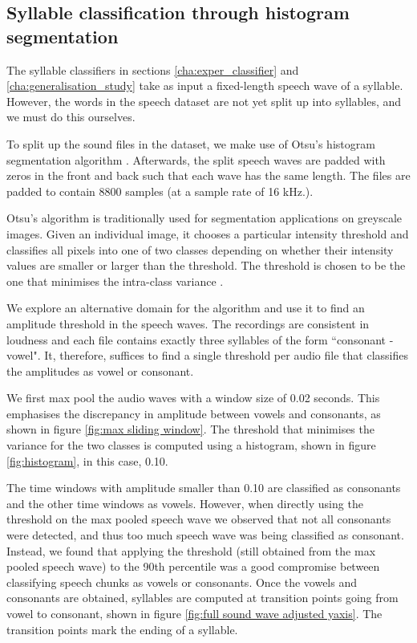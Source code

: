 \begin{appendices}
	\chapter{Syllable classification through histogram segmentation} \label{appendix:split_syllables}
	The syllable classifiers in sections \ref{cha:exper_classifier} and \ref{cha:generalisation_study} take as input a fixed-length speech wave of a syllable. However, the words in the speech dataset are not yet split up into syllables, and we must do this ourselves.
	
	To split up the sound files in the dataset, we make use of Otsu's histogram segmentation algorithm \citep{otsuTlresholdSelectionMethod1979}. Afterwards, the split speech waves are padded with zeros in the front and back such that each wave has the same length. The files are padded to contain 8800 samples (at a sample rate of 16 kHz.).
	
	Otsu's algorithm is traditionally used for segmentation applications on greyscale images. Given an individual image, it chooses a particular intensity threshold and classifies all pixels into one of two classes depending on whether their intensity values are smaller or larger than the threshold. The threshold is chosen to be the one that minimises the intra-class variance \cite{OtsuMethod2023}. 
	
	We explore an alternative domain for the algorithm and use it to find an amplitude threshold in the speech waves. The recordings are consistent in loudness and each file contains exactly three syllables of the form ``consonant - vowel". It, therefore, suffices to find a single threshold per audio file that classifies the amplitudes as vowel or consonant.
	
	We first max pool the audio waves with a window size of 0.02 seconds. This emphasises the discrepancy in amplitude between vowels and consonants, as shown in figure \ref{fig:max sliding window}. The threshold that minimises the variance for the two classes is computed using a histogram, shown in figure \ref{fig:histogram}, in this case, 0.10. 
	
	The time windows with amplitude smaller than 0.10 are classified as consonants and the other time windows as vowels. However, when directly using the threshold on the max pooled speech wave we observed that not all consonants were detected, and thus too much speech wave was being classified as consonant. Instead, we found that applying the threshold (still obtained from the max pooled speech wave) to the 90th percentile was a good compromise between classifying speech chunks as vowels or consonants. Once the vowels and consonants are obtained, syllables are computed at transition points going from vowel to consonant, shown in figure \ref{fig:full sound wave adjusted yaxis}. The transition points mark the ending of a syllable.


\end{appendices}
